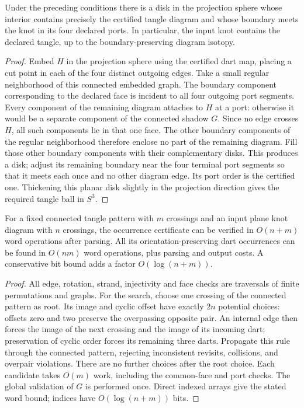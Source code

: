 \begin{lemma}
\label{lem:mon:disk}
Under the preceding conditions there is a disk in the projection sphere whose
interior contains precisely the certified tangle diagram and whose boundary
meets the knot in its four declared ports.  In particular, the input knot
contains the declared tangle, up to the boundary-preserving diagram isotopy.
\end{lemma}

\begin{proof}
Embed $H$ in the projection sphere using the certified dart map, placing a cut
point in each of the four distinct outgoing edges. Take a small regular
neighborhood of this connected
embedded graph.  The boundary component corresponding to the declared face
is incident to all four outgoing port segments.  Every component of the
remaining diagram attaches to $H$ at a port: otherwise it would be a separate
component of the connected shadow $G$.  Since no edge crosses $H$, all such
components lie in that one face.  The other boundary components of the regular
neighborhood therefore enclose no part of the remaining diagram.
Fill those other boundary components with their complementary disks.  This
produces a disk; adjust its remaining boundary near the four terminal port
segments so that it meets each once and no other diagram edge.  Its port
order is the certified one.  Thickening this planar disk slightly in the
projection direction gives the required tangle ball in $S^3$.
\end{proof}

\begin{proposition}
\label{prop:mon:matching}
For a fixed connected tangle pattern with $m$ crossings and an input plane
knot diagram with $n$ crossings, the occurrence certificate can be verified
in $O(n+m)$ word operations after parsing.  All its orientation-preserving
dart occurrences can be found in $O(nm)$ word operations, plus parsing and
output costs.  A conservative bit bound adds a factor $O(\log(n+m))$.
\end{proposition}

\begin{proof}
All edge, rotation, strand, injectivity and face checks are traversals of
finite permutations and graphs.  For the search, choose one crossing of the
connected pattern as root.  Its image and cyclic offset have exactly $2n$ potential
choices: offsets zero and two preserve the overpassing opposite pair.  An internal edge then forces the image of the next crossing and
the image of its incoming dart; preservation of cyclic order forces its
remaining three darts.  Propagate this rule through the connected pattern,
rejecting inconsistent revisits, collisions, and overpair violations.
There are no further choices after the root choice.  Each candidate takes
$O(m)$ work, including the common-face and port checks.  The global validation
of $G$ is performed once. Direct indexed arrays give the stated word bound;
indices have $O(\log(n+m))$ bits.
\end{proof}

